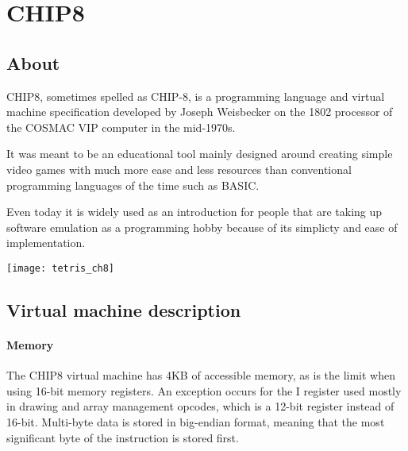 \chapter{CHIP8}
\label{chap:ch3}

\section{About}
\label{sec:ch3sec1}

\par CHIP8, sometimes spelled as CHIP-8, is a programming language and virtual machine specification developed by Joseph Weisbecker on the 1802 processor of the COSMAC VIP computer in the mid-1970s.

\par It was meant to be an educational tool mainly designed around creating simple video games with much more ease and less resources than conventional programming languages of the time such as BASIC.

\par Even today it is widely used as an introduction for people that are taking up software emulation as a programming hobby because of its simplicty and ease of implementation.

\vspace{1cm}

\begin{minipage}{\linewidth}
\texttt{[image: tetris\_ch8]}
\end{minipage}

\clearpage

\section{Virtual machine description}
\label{sec:ch3sec2}

\subsubsection{Memory}

\par The CHIP8 virtual machine has 4KB of accessible memory, as is the limit when using 16-bit memory registers. An exception occurs for the I register used mostly in drawing and array management opcodes, which is a 12-bit register instead of 16-bit. Multi-byte data is stored in big-endian format, meaning that the most significant byte of the instruction is stored first.

